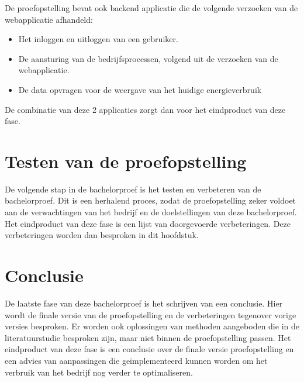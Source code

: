 De proefopstelling bevat ook backend applicatie die de volgende verzoeken van de webapplicatie afhandeld:

\begin{itemize}
    \item Het inloggen en uitloggen van een gebruiker.
    \item De aansturing van de bedrijfsprocessen, volgend uit de verzoeken van de webapplicatie.
    \item De data opvragen voor de weergave van het huidige energieverbruik
\end{itemize}

De combinatie van deze 2 applicaties zorgt dan voor het eindproduct van deze fase.

\section{Testen van de proefopstelling}
\label{sec:methodologie-testen-proefopstelling}

De volgende stap in de bachelorproef is het testen en verbeteren van de bachelorproef. Dit is een herhalend proces, zodat de proefopstelling zeker voldoet aan de verwachtingen van het bedrijf en de doelstellingen van deze bachelorproef. Het eindproduct van deze fase is een lijst van doorgevoerde verbeteringen. Deze verbeteringen worden dan besproken in dit hoofdstuk.

\section{Conclusie}
\label{sec:methodologie-conclusie}

De laatste fase van deze bachelorproef is het schrijven van een conclusie. Hier wordt de finale versie van de proefopstelling en de verbeteringen tegenover vorige versies besproken. Er worden ook oplossingen van methoden aangeboden die in de literatuurstudie besproken zijn, maar niet binnen de proefopstelling passen. Het eindproduct van deze fase is een conclusie over de finale versie proefopstelling en een advies van aanpassingen die geïmplementeerd kunnen worden om het verbruik van het bedrijf nog verder te optimaliseren.